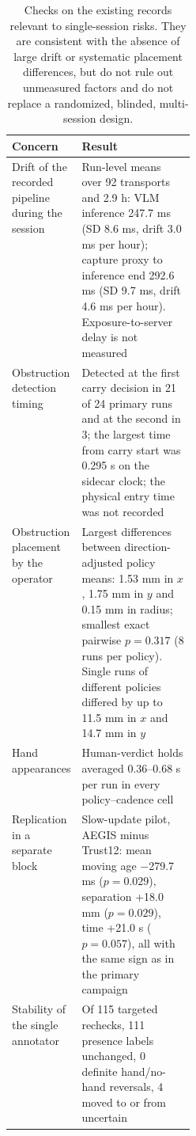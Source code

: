 \begin{table}[H]\centering\small
\caption{Checks on the existing records relevant to single-session risks. They are consistent with the absence of large drift or systematic placement differences, but do not rule out unmeasured factors and do not replace a randomized, blinded, multi-session design.}\label{tab:robustness}
\begin{tabularx}{\linewidth}{>{\raggedright\arraybackslash}p{0.27\linewidth}X}
\toprule Concern & Result\\ \midrule
Drift of the recorded pipeline during the session & Run-level means over 92 transports and 2.9 h: VLM inference 247.7 ms (SD 8.6 ms, drift 3.0 ms per hour); capture proxy to inference end 292.6 ms (SD 9.7 ms, drift 4.6 ms per hour). Exposure-to-server delay is not measured\\
Obstruction detection timing & Detected at the first carry decision in 21 of 24 primary runs and at the second in 3; the largest time from carry start was 0.295 s on the sidecar clock; the physical entry time was not recorded\\
Obstruction placement by the operator & Largest differences between direction-adjusted policy means: 1.53 mm in $x$, 1.75 mm in $y$ and 0.15 mm in radius; smallest exact pairwise $p=0.317$ (8 runs per policy). Single runs of different policies differed by up to 11.5 mm in $x$ and 14.7 mm in $y$\\
Hand appearances & Human-verdict holds averaged 0.36--0.68 s per run in every policy--cadence cell\\
Replication in a separate block & Slow-update pilot, AEGIS minus Trust12: mean moving age $-$279.7 ms ($p=0.029$), separation +18.0 mm ($p=0.029$), time +21.0 s ($p=0.057$), all with the same sign as in the primary campaign\\
Stability of the single annotator & Of 115 targeted rechecks, 111 presence labels unchanged, 0 definite hand/no-hand reversals, 4 moved to or from uncertain\\
\bottomrule
\end{tabularx}
\end{table}
